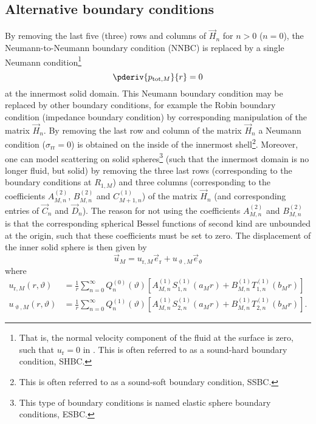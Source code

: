 \subsection{Alternative boundary conditions}
\label{Subsec1:alternativeBoundaryConditions}
By removing the last five (three) rows and columns of $\vec{H}_n$ for $n>0$ ($n=0$), the Neumann-to-Neumann boundary condition (NNBC) is replaced by a single Neumann condition\footnote{That is, the normal velocity component of the fluid at the surface is zero, such that $u_{\mathrm{r}}=0$ in . This is often referred to as a sound-hard boundary condition, SHBC.}
\begin{equation}
	\pderiv{p_{\mathrm{tot},M}}{r} = 0
\end{equation}
at the innermost solid domain. This Neumann boundary condition may be replaced by other boundary conditions, for example the Robin boundary condition (impedance boundary condition) by corresponding manipulation of the matrix $\vec{H}_n$. By removing the last row and column of the matrix $\vec{H}_n$ a Neumann condition ($\sigma_{\mathrm{rr}}=0$) is obtained on the inside of the innermost shell\footnote{This is often referred to as a sound-soft boundary condition, SSBC.}.  Moreover, one can model scattering on solid spheres\footnote{This type of boundary conditions is named elastic sphere boundary conditions, ESBC.} (such that the innermost domain is no longer fluid, but solid) by removing the three last rows (corresponding to the boundary conditions at $R_{1,M}$) and three columns (corresponding to the coefficients $A_{M,n}^{(2)}$, $B_{M,n}^{(2)}$ and $C_{M+1,n}^{(1)}$) of the matrix $\vec{H}_n$ (and corresponding entries of $\vec{C}_n$ and $\vec{D}_n$). The reason for not using the coefficients $A_{M,n}^{(2)}$ and $B_{M,n}^{(2)}$ is that the corresponding spherical Bessel functions of second kind are unbounded at the origin, such that these coefficients must be set to zero. The displacement of the inner solid sphere is then given by
\begin{equation}
	\vec{u}_M = u_{\mathrm{r},M} \vec{e}_{\mathrm{r}} + u_{\upvartheta,M} \vec{e}_\upvartheta
\end{equation}
where
\begin{align}
	u_{\mathrm{r},M}(r,\vartheta) &= \frac{1}{r}\sum_{n=0}^\infty Q_n^{(0)}(\vartheta)\left[A_{M,n}^{(1)}S_{1,n}^{(1)}(a_M r)+B_{M,n}^{(1)}T_{1,n}^{(1)}(b_M r)\right]\\
	u_{\upvartheta,M}(r,\vartheta) &= \frac{1}{r}\sum_{n=0}^\infty Q_n^{(1)}(\vartheta)\left[A_{M,n}^{(1)}S_{2,n}^{(1)}(a_M r)+B_{M,n}^{(1)}T_{2,n}^{(1)}(b_M r)\right].
\end{align} 
